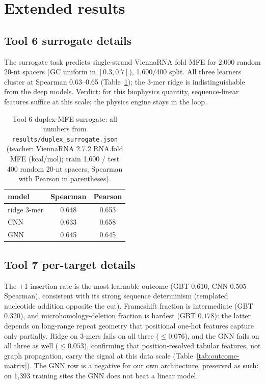 \documentclass[12pt]{article}
\begin{document}
\section{Extended results}
\subsection{Tool 6 surrogate details}
The surrogate task predicts single-strand ViennaRNA fold MFE for 2,000 random
20-nt spacers (GC uniform in $[0.3,0.7]$), 1,600/400 split. All three learners
cluster at Spearman 0.63--0.65 (Table~\ref{tab:surrogate}); the 3-mer ridge
is indistinguishable from the deep models. Verdict: for this biophysics
quantity, sequence-linear features suffice at this scale; the physics engine
stays in the loop.
\begin{table}[h]
\centering\small
\caption{Tool 6 duplex-MFE surrogate: all numbers from \texttt{results/duplex\_surrogate.json} (teacher: ViennaRNA 2.7.2 RNA.fold MFE (kcal/mol); train 1{,}600 / test 400 random 20-nt spacers, Spearman with Pearson in parentheses).}
\label{tab:surrogate}
\begin{tabular}{lcc}
\hline
model & Spearman & Pearson \\
\hline
ridge 3-mer & 0.648 & 0.653 \\
CNN & 0.633 & 0.658 \\
GNN & 0.645 & 0.645 \\
\hline
\end{tabular}
\end{table}
\subsection{Tool 7 per-target details}
The +1-insertion rate is the most learnable outcome (GBT $0.610$, CNN $0.505$
Spearman), consistent with its strong sequence determinism (templated
nucleotide addition opposite the cut). Frameshift fraction is intermediate
(GBT $0.320$), and microhomology-deletion fraction is hardest (GBT $0.178$):
the latter depends on long-range repeat geometry that positional one-hot
features capture only partially. Ridge on 3-mers fails on all three
($\leq 0.076$), and the GNN fails on all three as well ($\leq 0.053$),
confirming that position-resolved tabular features, not graph propagation,
carry the signal at this data scale (Table~\ref{tab:outcome-matrix}).
The GNN row is a negative for our own architecture, preserved as such:
on 1{,}393 training sites the GNN does not beat a linear model.
\end{document}
